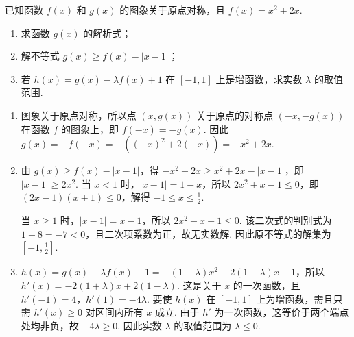 \begin{problem}
已知函数 \( f(x) \) 和 \( g(x) \) 的图象关于原点对称，且 \( f(x) = x^2 + 2x \).
\begin{enumerate}
\item 求函数 \( g(x) \) 的解析式；
\item 解不等式 \( g(x) \geqslant f(x) - |x - 1| \)；
\item 若 \(h(x) = g(x) - \lambda f(x) + 1\) 在 \([-1, 1]\) 上是增函数，求实数 \(\lambda\) 的取值范围.
\end{enumerate}

\begin{solution}
\begin{enumerate}
\item 图象关于原点对称，所以点 \((x,g(x))\) 关于原点的对称点 \((-x,-g(x))\) 在函数 \(f\) 的图象上，即 \(f(-x)=-g(x)\). 因此 \(g(x)=-f(-x)=-\left((-x)^2+2(-x)\right)=-x^2+2x\).

\item 由 \(g(x)\geqslant f(x)-|x-1|\)，得 \(-x^2+2x\geqslant x^2+2x-|x-1|\)，即 \(|x-1|\geqslant2x^2\). 当 \(x<1\) 时，\(|x-1|=1-x\)，所以 \(2x^2+x-1\leqslant0\)，即 \((2x-1)(x+1)\leqslant0\)，解得 \(-1\leqslant x\leqslant\frac{1}{2}\).

当 \(x\geqslant1\) 时，\(|x-1|=x-1\)，所以 \(2x^2-x+1\leqslant0\). 该二次式的判别式为 \(1-8=-7<0\)，且二次项系数为正，故无实数解. 因此原不等式的解集为 \(\left[-1,\frac{1}{2}\right]\).

\item \(h(x)=g(x)-\lambda f(x)+1=-(1+\lambda)x^2+2(1-\lambda)x+1\)，所以 \(h'(x)=-2(1+\lambda)x+2(1-\lambda)\). 这是关于 \(x\) 的一次函数，且 \(h'(-1)=4\)，\(h'(1)=-4\lambda\). 要使 \(h(x)\) 在 \([-1,1]\) 上为增函数，需且只需 \(h'(x)\geqslant0\) 对区间内所有 \(x\) 成立. 由于 \(h'\) 为一次函数，这等价于两个端点处均非负，故 \(-4\lambda\geqslant0\). 因此实数 \(\lambda\) 的取值范围为 \(\lambda\leqslant0\).
\end{enumerate}
\end{solution}
\end{problem}
